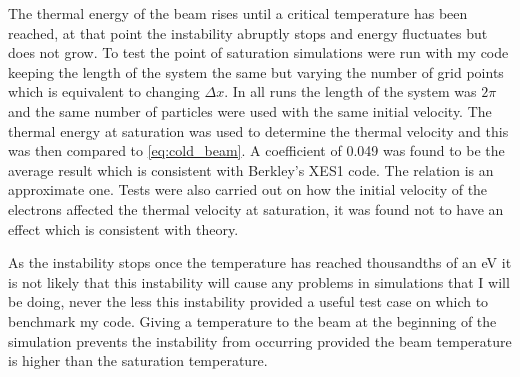 \documentclass[12pt]{article}
\begin{document}
\newpage
The thermal energy of the beam rises until a critical temperature has been reached, at that point the instability abruptly stops and energy fluctuates but does not grow. To test the point of saturation simulations were run with my code keeping the length of the system the same but varying the number of grid points which is equivalent to changing $\Delta x$. In all runs the length of the system was $2\pi$ and the same number of particles were used with the same initial velocity. The thermal energy at saturation was used to determine the thermal velocity and this was then compared to \eqref{eq:cold_beam}. A coefficient of 0.049 was found to be the average result which is consistent with Berkley's XES1 code. The relation is an approximate one. Tests were also carried out on how the initial velocity of the electrons affected the thermal velocity at saturation, it was found not to have an effect which is consistent with theory.

As the instability stops once the temperature has reached thousandths of an eV it is not likely that this instability will cause any problems in simulations that I will be doing, never the less this instability provided a useful test case on which to benchmark my code. Giving a temperature to the beam at the beginning of the simulation prevents the instability from occurring provided the beam temperature is higher than the saturation temperature.
\end{document}
